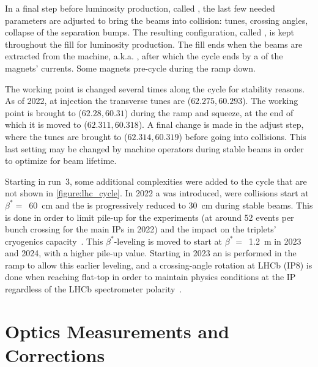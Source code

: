 In a final step before luminosity production, called , the last few needed parameters are adjusted to bring the beams into collision: tunes, crossing angles, collapse of the separation bumps.
The resulting configuration, called , is kept throughout the fill for luminosity production.
The fill ends when the beams are extracted from the machine, a.k.a. , after which the cycle ends by a  of the magnets' currents.
Some magnets pre-cycle during the ramp down.

The working point is changed several times along the cycle for stability reasons.
As of \num{2022}, at injection the transverse tunes are (\(62.275, 60.293\)).
The working point is brought to (\(62.28, 60.31\)) during the ramp and squeeze, at the end of which it is moved to (\(62.311, 60.318\)).
A final change is made in the adjust step, where the tunes are brought to (\(62.314, 60.319\)) before going into collisions.
This last setting may be changed by machine operators during stable beams in order to optimize for beam lifetime.

Starting in \Gls{run}~\num{3}, some additional complexities were added to the cycle that are not shown in \cref{figure:lhc_cycle}.
In \num{2022} a  was introduced, were collisions start at \(\beta^{\ast} =\)~\qty{60}{\centi\meter} and the  is progressively reduced to \qty{30}{\centi\meter} during stable beams.
This is done in order to limit pile-up for the experiments (at around \num{52} events per bunch crossing for the main \glspl{IP} in \num{2022}) and the impact on the triplets' cryogenics capacity~\cite{CERN:Fartoukh:LHC_Config_Run3, CERN:Ferlin:Cryogenics}.
This \(\beta^{\ast}\)-leveling is moved to start at \(\beta^{\ast} =\)~\qty{1.2}{\meter} in \num{2023} and \num{2024}, with a higher pile-up value.
Starting in \num{2023} an  is performed in the ramp to allow this earlier leveling, and a crossing-angle rotation at \acrshort{LHCb} (IP\num{8}) is done when reaching flat-top in order to maintain physics conditions at the IP regardless of the LHCb spectrometer polarity~\cite{CERN:Fartoukh:LHC_Config_Run3}.

\section{Optics Measurements and Corrections}
\label{section:optics_measurements_and_corrections}

